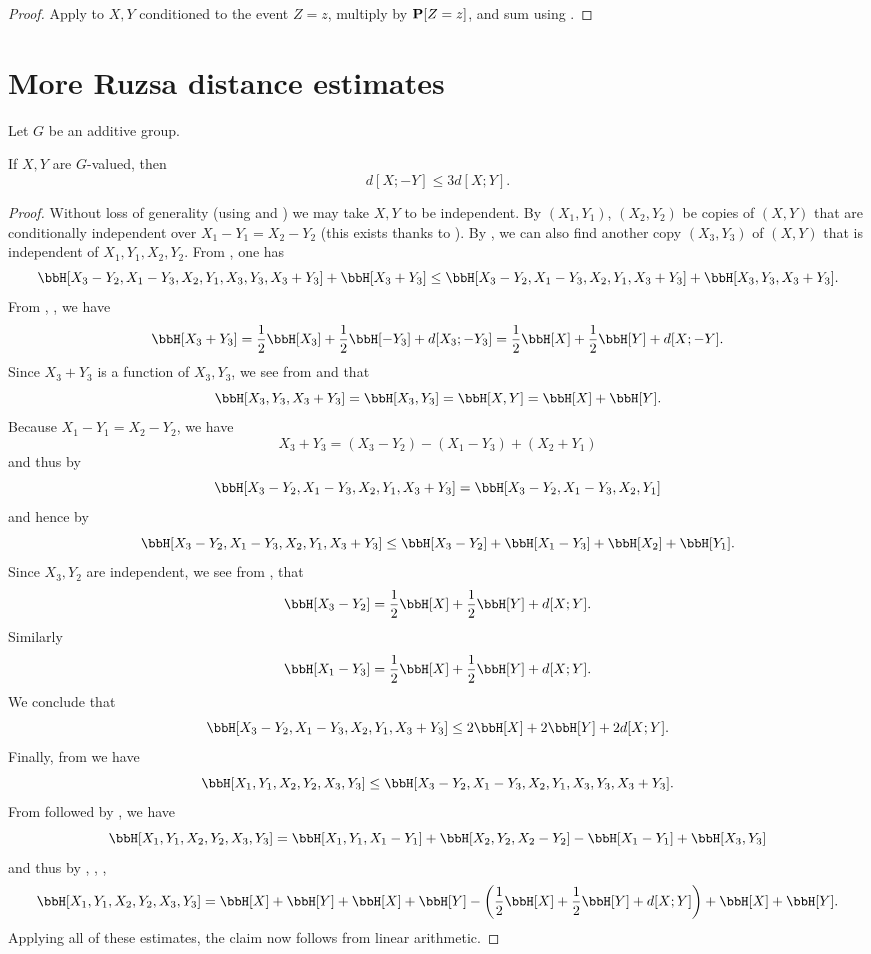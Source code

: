 \begin{proof}\leanok  Apply  to $X,Y$ conditioned to the event $Z=z$, multiply by ${\bf P}[Z=z]$, and sum using .
\end{proof}

\section{More Ruzsa distance estimates}

Let $G$ be an additive group.

\begin{lemma}\label{sign-flip}\leanok
  If $X,Y$ are $G$-valued, then
  $$  d[X ; -Y]  \leq 3 d[X;Y].$$
\end{lemma}

\begin{proof}\leanok
Without loss of generality (using  and ) we may take $X,Y$ to be independent.
By $(X_1,Y_1)$, $(X_2,Y_2)$ be copies of $(X,Y)$ that are conditionally independent over $X_1-Y_1=X_2-Y_2$ (this exists thanks to ).  By , we can also find another copy $(X_3,Y_3)$ of $(X,Y)$ that is independent of $X_1,Y_1,X_2,Y_2$.  From , one has
$$ \bbH[X_3-Y_2, X_1-Y_3, X_2, Y_1, X_3, Y_3, X_3+Y_3] + \bbH[X_3+Y_3] \leq \bbH[X_3-Y_2, X_1-Y_3, X_2, Y_1, X_3+Y_3] + \bbH[X_3, Y_3, X_3+Y_3].$$
From , ,  we have
$$ \bbH[X_3+Y_3] = \frac{1}{2} \bbH[X_3] + \frac{1}{2} \bbH[-Y_3] + d[X_3;-Y_3] = \frac{1}{2} \bbH[X] + \frac{1}{2} \bbH[Y] + d[X;-Y].$$
Since $X_3+Y_3$ is a function of $X_3,Y_3$, we see from  and  that
$$ \bbH[X_3,Y_3,X_3+Y_3] = \bbH[X_3,Y_3] = \bbH[X,Y] = \bbH[X]+\bbH[Y].$$
Because $X_1-Y_1=X_2-Y_2$, we have
$$ X_3+Y_3 = (X_3-Y_2) - (X_1-Y_3) + (X_2+Y_1)$$
and thus by 
$$ \bbH[X_3-Y_2, X_1-Y_3, X_2, Y_1, X_3+Y_3] = \bbH[X_3-Y_2, X_1-Y_3, X_2, Y_1]$$
and hence by 
$$ \bbH[X_3-Y_2, X_1-Y_3, X_2, Y_1, X_3+Y_3] \leq \bbH[X_3-Y_2] + \bbH[X_1-Y_3] + \bbH[X_2] + \bbH[Y_1].$$
Since $X_3,Y_2$ are independent, we see from ,  that
$$\bbH[X_3-Y_2] = \frac{1}{2} \bbH[X] + \frac{1}{2} \bbH[Y] + d[X; Y].$$
Similarly
$$ \bbH[X_1-Y_3] = \frac{1}{2} \bbH[X] + \frac{1}{2} \bbH[Y] + d[X; Y].$$
We conclude that
$$ \bbH[X_3-Y_2, X_1-Y_3, X_2, Y_1, X_3+Y_3] \leq 2\bbH[X] + 2\bbH[Y] + 2d[X; Y].$$
Finally, from  we have
$$ \bbH[X_1,Y_1,X_2,Y_2,X_3,Y_3] \leq \bbH[X_3-Y_2, X_1-Y_3, X_2, Y_1, X_3, Y_3, X_3+Y_3].$$
From  followed by , we have
$$\bbH[X_1,Y_1,X_2,Y_2,X_3,Y_3] = \bbH[X_1,Y_1,X_1-Y_1] + \bbH[X_2,Y_2,X_2-Y_2] - \bbH[X_1-Y_1] + \bbH[X_3,Y_3]$$
and thus by , , , 
$$\bbH[X_1,Y_1,X_2,Y_2,X_3,Y_3] = \bbH[X] + \bbH[Y] + \bbH[X] + \bbH[Y] -\left(\frac{1}{2}\bbH[X] + \frac{1}{2}\bbH[Y] + d[X; Y]\right) + \bbH[X] + \bbH[Y].$$
Applying all of these estimates, the claim now follows from linear arithmetic.
\end{proof}

